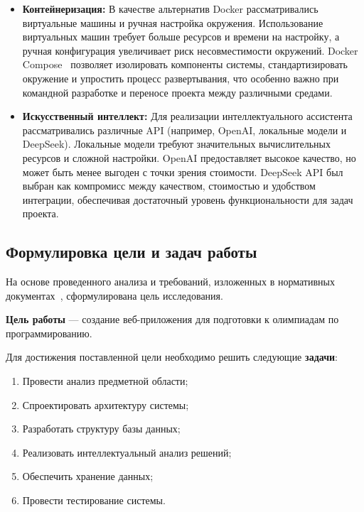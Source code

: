 \begin{itemize}
    \item \textbf{Контейнеризация:} В качестве альтернатив Docker рассматривались виртуальные машины и ручная настройка окружения. Использование виртуальных машин требует больше ресурсов и времени на настройку, а ручная конфигурация увеличивает риск несовместимости окружений. Docker Compose~\cite{docker_docs} позволяет изолировать компоненты системы, стандартизировать окружение и упростить процесс развертывания, что особенно важно при командной разработке и переносе проекта между различными средами.

	\item \textbf{Искусственный интеллект:} Для реализации интеллектуального ассистента рассматривались различные API (например, OpenAI, локальные модели и DeepSeek). Локальные модели требуют значительных вычислительных ресурсов и сложной настройки. OpenAI предоставляет высокое качество, но может быть менее выгоден с точки зрения стоимости. DeepSeek API был выбран как компромисс между качеством, стоимостью и удобством интеграции, обеспечивая достаточный уровень функциональности для задач проекта.
\end{itemize}

\subsection{Формулировка цели и задач работы}

На основе проведенного анализа и требований, изложенных в нормативных документах~\cite{gost_report}, сформулирована цель исследования.

\textbf{Цель работы} --- создание веб-приложения для подготовки к олимпиадам по программированию.

Для достижения поставленной цели необходимо решить следующие \textbf{задачи}:
\begin{enumerate}
	\item Провести анализ предметной области;
	\item Спроектировать архитектуру системы;
	\item Разработать структуру базы данных;
	\item Реализовать интеллектуальный анализ решений;
	\item Обеспечить хранение данных;
	\item Провести тестирование системы.
\end{enumerate}